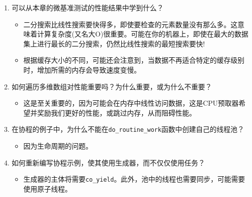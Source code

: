 \begin{enumerate}
\item
可以从本章的微基准测试的性能结果中学到什么？
\begin{itemize}
\item 
二分搜索比线性搜索要快得多，即使要检查的元素数量没有那么多。这意味着计算复杂度(又名大O)很重要。可能在你的机器上，即使在最大的数据集上进行最长的二分搜索，仍然比线性搜索的最短搜索要快!

\item 
根据缓存大小的不同，可能还会注意到，当数据不再适合特定的缓存级别时，增加所需的内存会导致速度变慢。
\end{itemize}

\item
如何遍历多维数组对性能重要吗？为什么重要，或为什么不重要？
\begin{itemize}
\item 
这是至关重要的，因为可能会在内存中线性访问数据，这是CPU预取器希望并奖励我们更好的性能，或跳过内存，从而阻碍性能。
\end{itemize}

\item
在协程的例子中，为什么不能在\texttt{do\_routine\_work}函数中创建自己的线程池？
\begin{itemize}
\item 
因为生命周期的问题。
\end{itemize}

\item
如何重新编写协程示例，使其使用生成器，而不仅仅使用任务？
\begin{itemize}
\item 
生成器的主体将需要\texttt{co\_yield}。此外，池中的线程也需要同步，可能需要使用原子线程。
\end{itemize}
\end{enumerate}